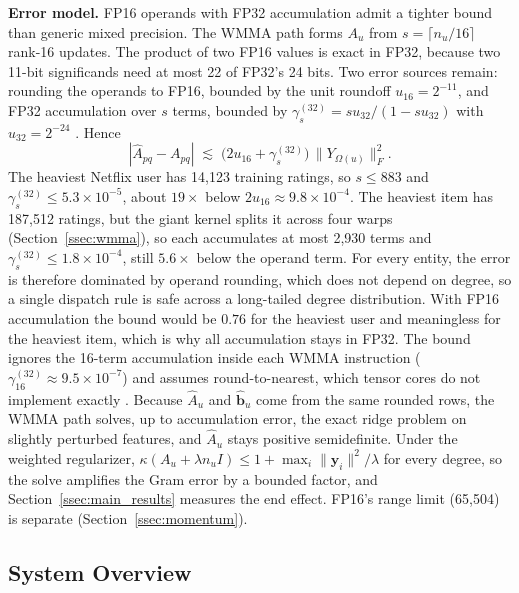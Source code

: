 \textbf{Error model.} FP16 operands with FP32 accumulation admit a tighter bound than generic mixed precision. The WMMA path forms $A_u$ from $s = \lceil n_u/16 \rceil$ rank-16 updates. The product of two FP16 values is exact in FP32, because two 11-bit significands need at most 22 of FP32's 24 bits. Two error sources remain: rounding the operands to FP16, bounded by the unit roundoff $u_{16} = 2^{-11}$, and FP32 accumulation over $s$ terms, bounded by $\gamma_s^{(32)} = s u_{32}/(1 - s u_{32})$ with $u_{32} = 2^{-24}$ \cite{blanchard2020mixed,higham2002accuracy}. Hence
\begin{equation}
|\hat{A}_{pq} - A_{pq}| \;\lesssim\; \bigl( 2u_{16} + \gamma_s^{(32)} \bigr)\, \lVert Y_{\Omega(u)} \rVert_F^{2}.
\label{eq:error_bound}
\end{equation}
The heaviest Netflix user has 14{,}123 training ratings, so $s \le 883$ and $\gamma_s^{(32)} \le 5.3 \times 10^{-5}$, about $19\times$ below $2u_{16} \approx 9.8 \times 10^{-4}$. The heaviest item has 187{,}512 ratings, but the giant kernel splits it across four warps (Section~\ref{ssec:wmma}), so each accumulates at most 2{,}930 terms and $\gamma_s^{(32)} \le 1.8 \times 10^{-4}$, still $5.6\times$ below the operand term. For every entity, the error is therefore dominated by operand rounding, which does not depend on degree, so a single dispatch rule is safe across a long-tailed degree distribution. With FP16 accumulation the bound would be $0.76$ for the heaviest user and meaningless for the heaviest item, which is why all accumulation stays in FP32. The bound ignores the 16-term accumulation inside each WMMA instruction ($\gamma_{16}^{(32)} \approx 9.5 \times 10^{-7}$) and assumes round-to-nearest, which tensor cores do not implement exactly \cite{markidis2018nvidia}. Because $\hat{A}_u$ and $\hat{\mathbf{b}}_u$ come from the same rounded rows, the WMMA path solves, up to accumulation error, the exact ridge problem on slightly perturbed features, and $\hat{A}_u$ stays positive semidefinite. Under the weighted regularizer, $\kappa(A_u + \lambda n_u I) \le 1 + \max_i \lVert \mathbf{y}_i \rVert^{2}/\lambda$ for every degree, so the solve amplifies the Gram error by a bounded factor, and Section~\ref{ssec:main_results} measures the end effect. FP16's range limit (65{,}504) is separate (Section~\ref{ssec:momentum}).

\subsection{System Overview}
\label{ssec:framework}


